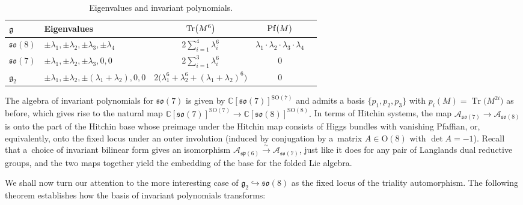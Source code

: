 \documentclass[pdftex]{sigma}
\numberwithin{equation}{section}
\def\C{{\mathbb C}}
\newcommand{\SO}{{\mathrm{SO}}}
\newcommand{\Tr}{\operatorname{Tr}}
\begin{document}
 \begin{table}[h]\centering\renewcommand{\arraystretch}{1.3}
\begin{tabular}{llccc}
 $\mathfrak{g}$ & Eigenvalues & ${\rm Tr}\big(M^6\big)$ & ${\rm Pf}(M)$ \\
\hline
$\mathfrak{so}(8)$ & $\pm \lambda_1,\pm \lambda_2,\pm \lambda_3,\pm \lambda_4$ &$2\sum_{i=1}^4\lambda_i^6$	& $\lambda_1\cdot \lambda_2\cdot\lambda_3\cdot\lambda_4$ \\
$\mathfrak{so}(7)$ & $\pm \lambda_1,\pm \lambda_2,\pm \lambda_3,0,0$ &$2\sum_{i=1}^3\lambda_i^6$ 	& 0 \\
$\mathfrak{g}_{2}$ & $\pm \lambda_1,\pm \lambda_2,\pm (\lambda_1+\lambda_2),0,0$ & $ 2\big(\lambda_1^6+\lambda_2^6+(\lambda_1+\lambda_2)^6\big)$ 	& 0
 \end{tabular}
\caption{Eigenvalues and invariant polynomials.} \label{table22}
\end{table}

The algebra of invariant polynomials for $\mathfrak{so}(7)$ is given by $\C [\mathfrak{so}(7)]^{\SO(7)}$ and admits a basis $\{p_1, p_2, p_3 \}$ with $p_i (M) = \Tr\big(M^{2i}\big) $ as before, which gives rise to the natural map
$\C [\mathfrak{so}(7)]^{\SO(7)} \rightarrow \C [\mathfrak{so}(8)]^{\SO(8)}.$
In terms of Hitchin systems, the map $
 \mathcal{A}_{\mathfrak{so}(7)} \rightarrow \mathcal{A}_{\mathfrak{so}(8)}$
is onto the part of the Hitchin base whose preimage under the Hitchin map consists of Higgs bundles with vanishing Pfaffian, or, equivalently, onto the fixed locus under an outer involution (induced by conjugation by a~matrix $A \in \mathrm{O}(8)$ with $\det A = -1$). Recall that a~choice of invariant bilinear form gives an isomorphism $\mathcal{A}_{\mathfrak{sp}(6)} \xrightarrow{\sim} \mathcal{A}_{\mathfrak{so}(7)}$, just like it does for any pair of Langlands dual reductive groups, and the two maps together yield the embedding of the base for the folded Lie algebra.

We shall now turn our attention to the more interesting case of $\mathfrak{g}_2 \hookrightarrow \mathfrak{so}(8)$ as the fixed locus of the triality automorphism. The following theorem establishes how the basis of invariant polynomials transforms:
\end{document}

